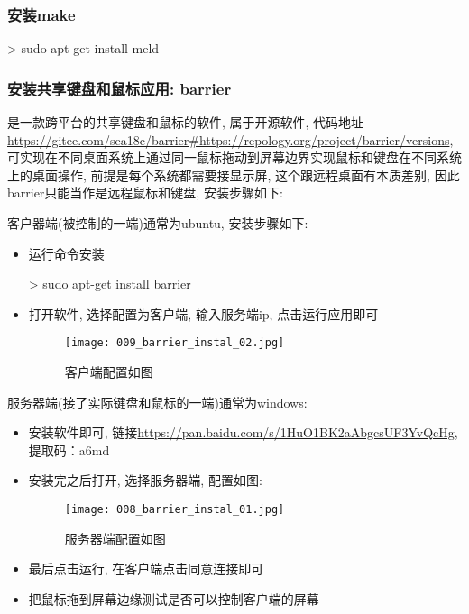 \subsubsection{安装make}
\begin{commandbox}
 > sudo apt-get install meld
\end{commandbox}

\subsubsection{安装共享键盘和鼠标应用: barrier}
是一款跨平台的共享键盘和鼠标的软件, 属于开源软件, 代码地址\url{https://gitee.com/sea18c/barrier#https://repology.org/project/barrier/versions}, 可实现在不同桌面系统上通过同一鼠标拖动到屏幕边界实现鼠标和键盘在不同系统上的桌面操作, 前提是每个系统都需要接显示屏, 这个跟远程桌面有本质差别, 因此barrier只能当作是远程鼠标和键盘, 安装步骤如下:

客户器端(被控制的一端)通常为ubuntu, 安装步骤如下:
\begin{itemize}
\item 运行命令安装
\begin{commandbox}
 > sudo apt-get install barrier
\end{commandbox}

\item 打开软件, 选择配置为客户端, 输入服务端ip, 点击运行应用即可
\begin{figure}[H]
\centering
\texttt{[image: 009\_barrier\_instal\_02.jpg]}
\caption{客户端配置如图}
\end{figure}

\end{itemize}

服务器端(接了实际键盘和鼠标的一端)通常为windows:
\begin{itemize}

\item 安装软件即可, 链接\url{https://pan.baidu.com/s/1HuO1BK2aAbgcsUF3YvQcHg}, 提取码：a6md

\item 安装完之后打开, 选择服务器端, 配置如图:
\begin{figure}[H]
\centering
\texttt{[image: 008\_barrier\_instal\_01.jpg]}
\caption{服务器端配置如图}
\end{figure}

\item 最后点击运行, 在客户端点击同意连接即可

\item 把鼠标拖到屏幕边缘测试是否可以控制客户端的屏幕

\end{itemize}


